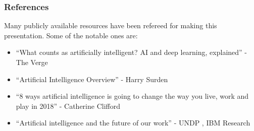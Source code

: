 \begin{frame}\frametitle{References}
Many publicly available resources have been refereed for making this presentation. Some of the notable ones are:
\small
\begin{itemize}
\item ``What counts as artificially intelligent? AI and deep learning, explained'' - The Verge
\item ``Artificial Intelligence Overview'' - Harry Surden
\item ``8 ways artificial intelligence is going to change the way you live, work and play in 2018'' - Catherine Clifford
\item ``Artificial intelligence and the future of our work'' - UNDP , IBM Research
\end{itemize}
\end{frame}
